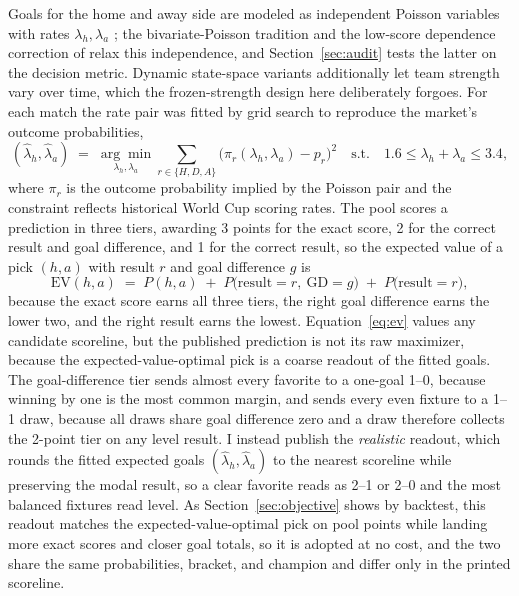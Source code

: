 \documentclass[11pt,letterpaper]{article}
\begin{document}
Goals for the home and away side are modeled as independent Poisson variables with rates $\lambda_h, \lambda_a$ \citep{maher1982}; the bivariate-Poisson tradition \citep{karlis2003} and the low-score dependence correction of \citet{dixoncoles1997} relax this independence, and Section~\ref{sec:audit} tests the latter on the decision metric. Dynamic state-space variants \citep{koopmanlit2015} additionally let team strength vary over time, which the frozen-strength design here deliberately forgoes. For each match the rate pair was fitted by grid search to reproduce the market's outcome probabilities,
\begin{equation}
(\hat\lambda_h, \hat\lambda_a) \;=\; \underset{\lambda_h,\lambda_a}{\arg\min} \sum_{r \in \{H,D,A\}} \bigl(\pi_r(\lambda_h,\lambda_a) - p_r\bigr)^2
\quad \text{s.t.} \quad 1.6 \le \lambda_h + \lambda_a \le 3.4,
\end{equation}
where $\pi_r$ is the outcome probability implied by the Poisson pair and the constraint reflects historical World Cup scoring rates. The pool scores a prediction in three tiers, awarding 3 points for the exact score, 2 for the correct result and goal difference, and 1 for the correct result, so the expected value of a pick $(h,a)$ with result $r$ and goal difference $g$ is
\begin{equation}
\mathrm{EV}(h,a) \;=\; P(h,a) \;+\; P\bigl(\text{result}=r,\ \text{GD}=g\bigr) \;+\; P\bigl(\text{result}=r\bigr),
\label{eq:ev}
\end{equation}
because the exact score earns all three tiers, the right goal difference earns the lower two, and the right result earns the lowest. Equation~\eqref{eq:ev} values any candidate scoreline, but the published prediction is not its raw maximizer, because the expected-value-optimal pick is a coarse readout of the fitted goals. The goal-difference tier sends almost every favorite to a one-goal 1--0, because winning by one is the most common margin, and sends every even fixture to a 1--1 draw, because all draws share goal difference zero and a draw therefore collects the 2-point tier on any level result. I instead publish the \emph{realistic} readout, which rounds the fitted expected goals $(\hat\lambda_h, \hat\lambda_a)$ to the nearest scoreline while preserving the modal result, so a clear favorite reads as 2--1 or 2--0 and the most balanced fixtures read level. As Section~\ref{sec:objective} shows by backtest, this readout matches the expected-value-optimal pick on pool points while landing more exact scores and closer goal totals, so it is adopted at no cost, and the two share the same probabilities, bracket, and champion and differ only in the printed scoreline.
\end{document}
